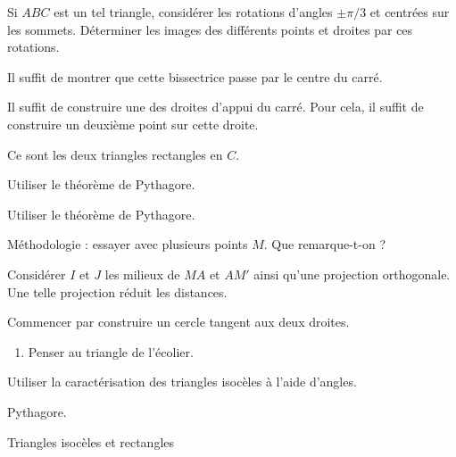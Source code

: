 \begin{Hint}{66}
Si $ABC$ est un tel triangle, considérer les rotations d'angles $\pm \pi/3$ et centrées sur les sommets. Déterminer les images des différents points et droites par ces rotations.
\end{Hint}
\begin{Hint}{69}
Il suffit de montrer que cette bissectrice passe par le centre du carré.
\end{Hint}
\begin{Hint}{70}
Il suffit de construire une des droites d'appui du carré. Pour cela, il suffit de construire un deuxième point sur cette droite.
\end{Hint}
\begin{Hint}{71}
Ce sont les deux triangles rectangles en $C$.
\end{Hint}
\begin{Hint}{73}
 Utiliser le théorème de Pythagore.
\end{Hint}
\begin{Hint}{74}
Utiliser le théorème de Pythagore.
\end{Hint}
\begin{Hint}{75}
 Méthodologie : essayer avec plusieurs points $M$. Que remarque-t-on ?


\end{Hint}
\begin{Hint}{76}
Considérer $I$ et $J$ les milieux de $MA$ et $AM'$ ainsi qu'une projection orthogonale. Une telle projection réduit les distances.
\end{Hint}
\begin{Hint}{81}
Commencer par construire un cercle tangent aux deux droites.
\end{Hint}
\begin{Hint}{82}
\begin{enumerate}
\item Penser au triangle de l'écolier.
\end{enumerate}
\end{Hint}
\begin{Hint}{83}
Utiliser la caractérisation des triangles isocèles à l'aide d'angles.
\end{Hint}
\begin{Hint}{84}
Pythagore.
\end{Hint}
\begin{Hint}{85}
Triangles isocèles et rectangles
\end{Hint}
